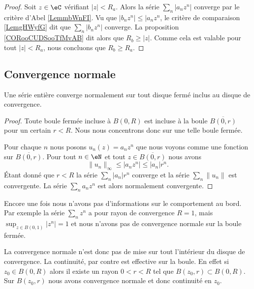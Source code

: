 \begin{proof}
	Soit \( z\in \eC\) vérifiant \( | z |<R_a\). Alors la série \( \sum_n| a_nz^n |\) converge par le critère d'Abel \ref{LemmbWnFI}. Vu que \( | b_nz^n |\leq |a_nz^n\), le critère de comparaison \ref{LemgHWyfG} dit que \( \sum_n| b_nz^n |\) converge. La proposition \ref{CORooCUDSooTfMvAB} dit alors que \( R_b\geq | z |\). Comme cela est valable pour tout \( | z |<R_a\), nous concluons que \( R_b\geq R_a\).
\end{proof}


\subsection{Convergence normale}

\begin{theorem}
	Une série entière converge normalement sur tout disque fermé inclus au disque de convergence.
\end{theorem}

\begin{proof}
	Toute boule fermée incluse à \( B(0,R)\) est incluse à la boule \( \overline{ B(0,r) }\) pour un certain \( r<R\). Nous nous concentrons donc sur une telle boule fermée.

	Pour chaque \( n\) nous posons \( u_n(z)=a_nz^n\) que nous voyons comme une fonction sur \( \overline{ B(0,r) }\). Pour tout \( n\in \eN\) et tout \( z\in\overline{ B(0,r) }\) nous avons
	\begin{equation}
		\| u_n \|_{\infty}\leq| a_nz^n |\leq | a_n |r^n.
	\end{equation}
	Étant donné que \( r<R\) la série \( \sum_n | a_n |r^n\) converge et la série \( \sum_n\| u_n \|\) est convergente. La série \( \sum_na_nz^n\) est alors normalement convergente.
\end{proof}

\begin{example}
	Encore une fois nous n'avons pas d'informations sur le comportement au bord. Par exemple la série \( \sum_nz^n\) a pour rayon de convergence \( R=1\), mais \( \sup_{z\in B(0,1)}| z^n |=1\) et nous n'avons pas de convergence normale sur la boule fermée.
\end{example}

La convergence normale n'est donc pas de mise sur tout l'intérieur du disque de convergence. La continuité, par contre est effective sur la boule. En effet si \( z_0\in B(0,R)\) alors il existe un rayon \( 0<r<R\) tel que \( B(z_0,r)\subset B(0,R)\). Sur \( B(z_0,r)\) nous avons convergence normale et donc continuité en \( z_0\).

